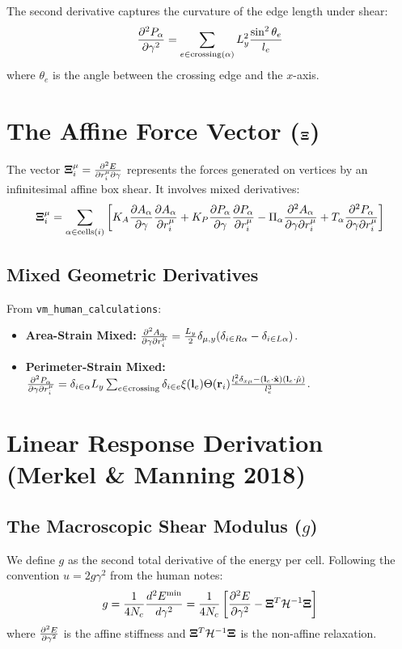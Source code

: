 \documentclass[12pt]{article}
\begin{document}
The second derivative captures the curvature of the edge length under shear:
\begin{equation}
    \pdv[2]{P_\alpha}{\gamma} = \sum_{e \in \text{crossing}(\alpha)} L_y^2 \frac{\sin^2\theta_e}{l_e}
\end{equation}
where $\theta_e$ is the angle between the crossing edge and the $x$-axis.

\section{The Affine Force Vector ($\vb{\Xi}$)}
The vector $\mathbf{\Xi}_i^\mu = \pdv{E}{r_i^\mu}{\gamma}$ represents the forces generated on vertices by an infinitesimal affine box shear. It involves mixed derivatives:
\begin{equation}
    \mathbf{\Xi}_i^\mu = \sum_{\alpha \in \text{cells}(i)} \left[ K_A \pdv{A_\alpha}{\gamma} \pdv{A_\alpha}{r_i^\mu} + K_P \pdv{P_\alpha}{\gamma} \pdv{P_\alpha}{r_i^\mu} - \Pi_\alpha \pdv{A_\alpha}{\gamma}{r_i^\mu} + T_\alpha \pdv{P_\alpha}{\gamma}{r_i^\mu} \right]
\end{equation}

\subsection{Mixed Geometric Derivatives}
From \texttt{vm\_human\_calculations}:
\begin{itemize}
    \item \textbf{Area-Strain Mixed:} $\pdv{A_\alpha}{\gamma}{r_i^\mu} = \frac{L_y}{2} \delta_{\mu,y} (\delta_{i \in R\alpha} - \delta_{i \in L\alpha})$.
    \item \textbf{Perimeter-Strain Mixed:} $\pdv{P_\alpha}{\gamma}{r_i^\mu} = \delta_{i \in \alpha} L_y \sum_{e \in \text{crossing}} \delta_{i \in e} \xi(\vb{l}_e) \Theta(\vb{r}_i) \frac{l_e^2 \delta_{x\mu} - (\vb{l}_e \cdot \hat{\vb{x}}) (\vb{l}_e \cdot \hat{\vb{\mu}})}{l_e^3}$.
\end{itemize}

\section{Linear Response Derivation (Merkel \& Manning 2018)}

\subsection{The Macroscopic Shear Modulus ($g$)}
We define $g$ as the second total derivative of the energy per cell. Following the convention $u = 2g\gamma^2$ from the human notes:
\begin{equation}
    g = \frac{1}{4 N_c} \frac{d^2 E^{\text{min}}}{d\gamma^2} = \frac{1}{4 N_c} \left[ \pdv[2]{E}{\gamma} - \vb{\Xi}^T \mathcal{H}^{-1} \vb{\Xi} \right]
\end{equation}
where $\pdv[2]{E}{\gamma}$ is the affine stiffness and $\vb{\Xi}^T \mathcal{H}^{-1} \vb{\Xi}$ is the non-affine relaxation.
\end{document}
